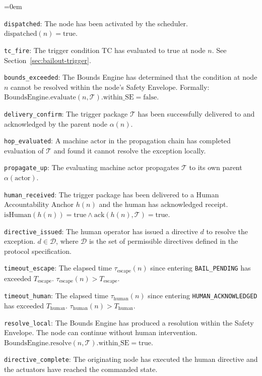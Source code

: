 \begin{trivlist}\itemindent=0em
\item[\texttt{dispatched}:] The node has been activated by the scheduler.
  $\text{dispatched}(n) = \text{true}$.

\item[\texttt{tc\_fire}:] The trigger condition TC has evaluated to true at node
  $n$. See Section~\ref{sec:bailout-trigger}.

\item[\texttt{bounds\_exceeded}:] The Bounds Engine has determined that the
  condition at node $n$ cannot be resolved within the node's Safety Envelope.
  Formally: $\text{BoundsEngine.evaluate}(n, \mathcal{T}).\text{within\_SE} =
  \text{false}$.

\item[\texttt{delivery\_confirm}:] The trigger package $\mathcal{T}$ has been
  successfully delivered to and acknowledged by the parent node $\alpha(n)$.

\item[\texttt{hop\_evaluated}:] A machine actor in the propagation chain has
  completed evaluation of $\mathcal{T}$ and found it cannot resolve the
  exception locally.

\item[\texttt{propagate\_up}:] The evaluating machine actor propagates $\mathcal{T}$
  to its own parent $\alpha(\text{actor})$.

\item[\texttt{human\_received}:] The trigger package has been delivered to a
  Human Accountability Anchor $h(n)$ and the human has acknowledged receipt.
  $\text{isHuman}(h(n)) = \text{true} \land \text{ack}(h(n), \mathcal{T}) =
  \text{true}$.

\item[\texttt{directive\_issued}:] The human operator has issued a directive $d$
  to resolve the exception. $d \in \mathcal{D}$, where $\mathcal{D}$ is the set
  of permissible directives defined in the protocol specification.

\item[\texttt{timeout\_escape}:] The elapsed time $\tau_{\text{escape}}(n)$
  since entering \texttt{BAIL\_PENDING} has exceeded $T_{\text{escape}}$.
  $\tau_{\text{escape}}(n) > T_{\text{escape}}$.

\item[\texttt{timeout\_human}:] The elapsed time $\tau_{\text{human}}(n)$ since
  entering \texttt{HUMAN\_ACKNOWLEDGED} has exceeded $T_{\text{human}}$.
  $\tau_{\text{human}}(n) > T_{\text{human}}$.

\item[\texttt{resolve\_local}:] The Bounds Engine has produced a resolution
  within the Safety Envelope. The node can continue without human intervention.
  $\text{BoundsEngine.resolve}(n, \mathcal{T}).\text{within\_SE} = \text{true}$.

\item[\texttt{directive\_complete}:] The originating node has executed the
  human directive and the actuators have reached the commanded state.
\end{trivlist}

